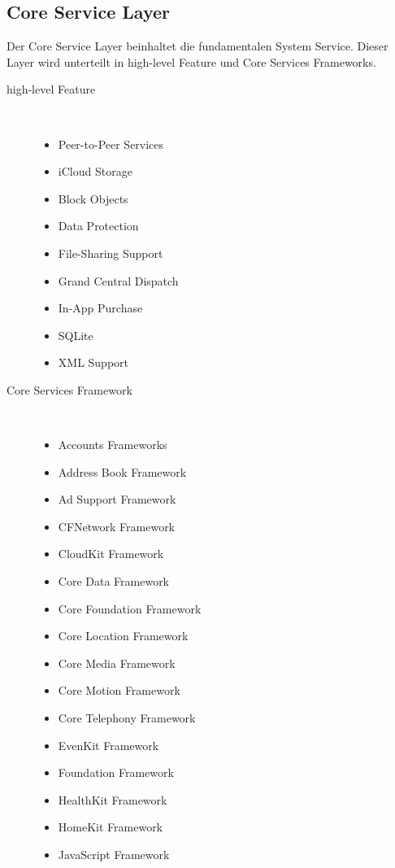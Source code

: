 \subsection{Core Service Layer}
\label{sec:CoreServiceLayer}		
Der \glqq Core Service Layer\grqq{} beinhaltet die fundamentalen System
Service. Dieser Layer wird unterteilt in \glqq high-level\grqq{} Feature und
Core Services Frameworks.
\begin{description}
	\item[\glqq high-level\grqq{} Feature]~\par
	\begin{itemize}
		\item Peer-to-Peer Services
		\item iCloud Storage
		\item Block Objects
		\item Data Protection
		\item File-Sharing Support
		\item Grand Central Dispatch
		\item In-App Purchase
		\item SQLite
		\item XML Support 
	\end{itemize}
	\item[\glqq Core Services Framework\grqq{}]~\par
	\begin{multicols}{2}
	\begin{itemize}
		\item Accounts Frameworks
		\item Address Book Framework
		\item Ad Support Framework
		\item CFNetwork Framework
		\item CloudKit Framework
		\item Core Data Framework
		\item Core Foundation Framework
		\item Core Location Framework
		\item Core Media Framework
		\item Core Motion Framework
		\item Core Telephony Framework
		\item EvenKit Framework
		\item Foundation Framework
		\item HealthKit Framework
		\item HomeKit Framework
		\item JavaScript Framework

\end{itemize}
\end{multicols}
\end{description}
